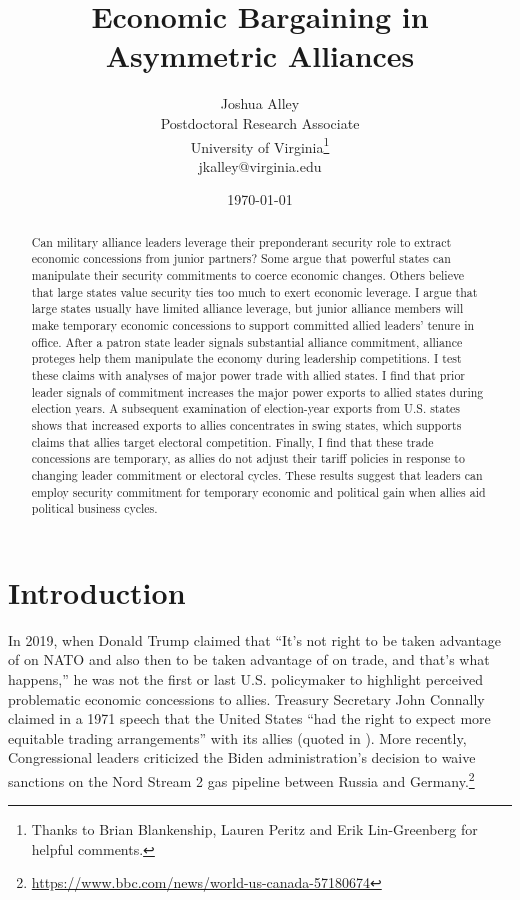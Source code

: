 \documentclass[12pt]{article}
\title{\textbf{Economic Bargaining in Asymmetric Alliances}}
\author{Joshua Alley \\
Postdoctoral Research Associate \\
University of Virginia\thanks{Thanks to Brian Blankenship, Lauren Peritz and Erik Lin-Greenberg for helpful comments.} \\
jkalley@virginia.edu
}
\date{\today}
\begin{document}
\maketitle 

\begin{abstract}
Can military alliance leaders leverage their preponderant security role to extract economic concessions from junior partners?
Some argue that powerful states can manipulate their security commitments to coerce economic changes. 
Others believe that large states value security ties too much to exert economic leverage.  
I argue that large states usually have limited alliance leverage, but junior alliance members will make temporary economic concessions to support committed allied leaders' tenure in office.
After a patron state leader signals substantial alliance commitment, alliance proteges help them manipulate the economy during leadership competitions.  
I test these claims with analyses of major power trade with allied states. 
I find that prior leader signals of commitment increases the major power exports to allied states during election years. 
A subsequent examination of election-year exports from U.S. states shows that increased exports to allies concentrates in swing states, which supports claims that allies target electoral competition.
Finally, I find that these trade concessions are temporary, as allies do not adjust their tariff policies in response to changing leader commitment or electoral cycles. 
These results suggest that leaders can employ security commitment for temporary economic and political gain when allies aid political business cycles. 
\end{abstract} 


\newpage 
\doublespace 


\section{Introduction}

In 2019, when Donald Trump claimed that ``It's not right to be taken advantage of on NATO and also then to be taken advantage of on trade, and that's what happens,'' he was not the first or last U.S. policymaker to highlight perceived problematic economic concessions to allies.
Treasury Secretary John Connally claimed in a 1971 speech that the United States ``had the right to expect more equitable trading arrangements'' with its allies (quoted in \citet[pg 175]{Sayle2019}).
More recently, Congressional leaders criticized the Biden administration's decision to waive sanctions on the Nord Stream 2 gas pipeline between Russia and Germany.\footnote{\url{https://www.bbc.com/news/world-us-canada-57180674}}
\end{document}
